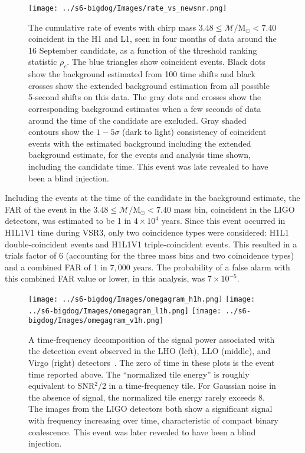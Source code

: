 \documentclass[prd,superscriptaddress,showpacs,amssymb,amsmath,amsfonts,aps,altaffilletter,nofootinbib,letterpaper,twocolumn]{revtex4}
\def\Msun{\ensuremath{\mathrm{M_{\odot}}}}
\def\dogTrialFAR{1 in $4 \times 10^{4}$ years}
\def\dogFAR{1 in $7,000$ years}
\def\dogFAP{\ensuremath{7 \times 10^{-5}}}
\begin{document}
\begin{figure}[tp]
\texttt{[image: ../s6-bigdog/Images/rate\_vs\_newsnr.png]}
\caption{ The cumulative rate of events with chirp mass $3.48 \le
\mathcal{M}/\Msun < 7.40$ coincident in the H1 and L1, seen in four
months of data around the 16 September candidate, as a function of the
threshold ranking statistic $\rho_c$.  The blue triangles show
coincident events.  Black dots show the background estimated from 100
time shifts and black crosses show the extended background estimation
from all possible 5-second shifts on this data.  The gray dots and
crosses show the corresponding background estimates when a few seconds
of data around the time of the candidate are excluded.  Gray shaded
contours show the $1 - 5\sigma$ (dark to light) consistency of
coincident events with the estimated background including the extended
background estimate, for the events and analysis time shown, including
the candidate time.  This event was late revealed to have been a blind
injection. }
\label{fig:far}
\end{figure}


Including the events at the time of the candidate in the background estimate,
the FAR of the event in the $3.48 \le \mathcal{M}/\Msun < 7.40$ mass bin,
coincident in the LIGO detectors, was estimated to be \dogTrialFAR.
Since this event occurred in H1L1V1 time during VSR3, only two coincidence
types were considered: H1L1 double-coincident events and H1L1V1
triple-coincident events.  This resulted in a trials factor of 6 (accounting
for the three mass bins and two coincidence types) and a combined FAR of
\dogFAR.  The probability of a false alarm with this combined FAR
value or lower, in this analysis, was \dogFAP.

\begin{figure*}[htb]
\begin{center}
\texttt{[image: ../s6-bigdog/Images/omegagram\_h1h.png]}
\texttt{[image: ../s6-bigdog/Images/omegagram\_l1h.png]}
\texttt{[image: ../s6-bigdog/Images/omegagram\_v1h.png]}
\caption{A time-frequency decomposition of the signal power associated with the
detection event observed in the \ac{LHO} (left), \ac{LLO} (middle), and Virgo
(right) detectors~\cite{ref:omegagrams}.  The zero of time in these plots is
the event time reported above.  The ``normalized tile energy'' is roughly
equivalent to SNR$^2$/2 in a time-frequency tile. For Gaussian noise in the
absence of signal, the normalized tile energy rarely exceeds 8.  The images
from the LIGO detectors both show a significant signal with frequency
increasing over time, characteristic of compact binary coalescence.
This event was later revealed to have been a blind injection.}
\label{fig:omegagrams}
\end{center}
\end{figure*}
\end{document}

